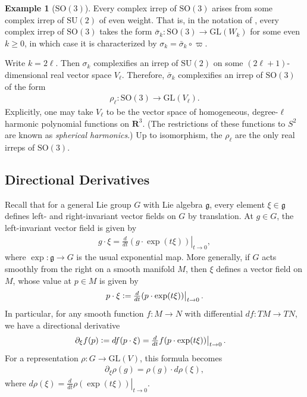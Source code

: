 \documentclass[a4paper,10pt,leqno]{article}
\numberwithin{equation}{section}
\theoremstyle{plain}
\theoremstyle{definition}
\newtheorem{ex}[thm]{Example}
\theoremstyle{remark}
\newcommand{\bb}{\mathbf}
\newcommand{\fr}{\mathfrak}
\newcommand{\sapphire}[1]{\textcolor{sapphire}{#1}}
\newcommand{\dfemph}[1]{\sapphire{\emph{#1}}}
\newcommand{\GL}{\mathrm{GL}}
\newcommand{\SU}{\mathrm{SU}}
\newcommand{\SO}{\mathrm{SO}}
\begin{document}
\begin{ex}[$\mathrm{SO}(3)$]\label{ex:so-3}
Every complex irrep of $\SO(3)$ arises from some complex irrep of $\SU(2)$ of even weight.
That is, in the notation of , every complex irrep of $\SO(3)$ takes the form $\bar{\sigma}_k \colon \SO(3) \to \GL(W_k)$ for some even $k \geq 0$, in which case it is characterized by $\sigma_k = \bar{\sigma}_k \circ \varpi$.

Write $k = 2\ell$.
Then $\sigma_k$ complexifies an irrep of $\SU(2)$ on some $(2\ell + 1)$-dimensional real vector space $V_\ell$.
Therefore, $\bar{\sigma}_k$ complexifies an irrep of $\SO(3)$ of the form
\begin{align} 
\rho_\ell \colon \SO(3) \to \GL(V_\ell).
\end{align} 
Explicitly, one may take $V_\ell$ to be the vector space of homogeneous, degree-$\ell$ harmonic polynomial functions on $\bb{R}^3$.
(The restrictions of these functions to $S^2$ are known as \dfemph{spherical harmonics}.)
Up to isomorphism, the $\rho_\ell$ are the only real irreps of $\SO(3)$.
\end{ex}

\subsection{Directional Derivatives}

Recall that for a general Lie group $G$ with Lie algebra $\fr{g}$, every element $\xi \in \fr{g}$ defines left- and right-invariant vector fields on $G$ by translation.
At $g \in G$, the left-invariant vector field is given by
\begin{align}
g \cdot \xi = \!\left.\tfrac{d}{dt} (g \cdot \exp(t\xi)) \right|_{t \to 0},
\end{align}
where $\exp \colon \fr{g} \to G$ is the usual exponential map.
More generally, if $G$ acts smoothly from the right on a smooth manifold $M$, then $\xi$ defines a vector field on $M$, whose value at $p \in M$ is given by
\begin{align}
p \cdot \xi \vcentcolon= \!\left.\tfrac{d}{dt} (p \cdot \exp(t\xi)) \right|_{t \to 0}.
\end{align}
In particular, for any smooth function $f \colon M \to N$ with differential $df \colon TM \to TN$, we have a directional derivative
\begin{align}
\partial_\xi f(p) 
	&\vcentcolon= df( p \cdot \xi )
	= \!\left.\tfrac{d}{dt} f(p \cdot \exp(t\xi)) \right|_{t \to 0}.
\end{align}
For a representation $\rho \colon G \to \GL(V)$, this formula becomes
\begin{align}\label{eq:derivative}
\partial_\xi \rho(g)
	= \rho(g) \cdot d\rho(\xi),
\end{align}
where $d\rho(\xi) = \!\left.\frac{d}{dt} \rho(\exp(t\xi)) \right|_{t \to 0}$.
\end{document}
